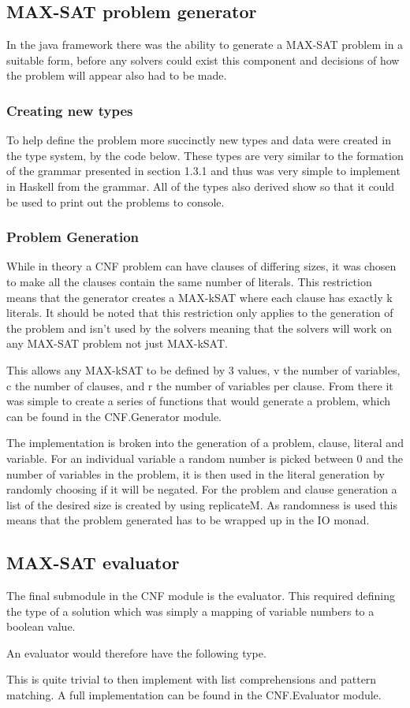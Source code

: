 \documentclass[a4paper]{article}
\begin{document}
\subsection{MAX-SAT problem generator}
In the java framework there was the ability to generate a MAX-SAT problem in a suitable form, before any solvers could exist this component and decisions of how the problem will appear also had to be made.
\subsubsection{Creating new types}
To help define the problem more succinctly new types and data were created in the type system, by the code below.
These types are very similar to the formation of the grammar presented in section 1.3.1 and thus was very simple to implement in Haskell from the grammar.
All of the types also derived show so that it could be used to print out the problems to console.

\subsubsection{Problem Generation}
While in theory a CNF problem can have clauses of differing sizes, it was chosen to make all the clauses contain the same number of literals.
This restriction means that the generator creates a MAX-kSAT where each clause has exactly k literals.
It should be noted that this restriction only applies to the generation of the problem and isn't used by the solvers meaning that the solvers will work on any MAX-SAT problem not just MAX-kSAT\@.
\par
This allows any MAX-kSAT to be defined by 3 values, v the number of variables, c the number of clauses, and r the number of variables per clause.
From there it was simple to create a series of functions that would generate a problem, which can be found in the CNF.Generator module.
\par
The implementation is broken into the generation of a problem, clause, literal and variable.
For an individual variable a random number is picked between 0 and the number of variables in the problem, it is then used in the literal generation by randomly choosing if it will be negated.
For the problem and clause generation a list of the desired size is created by using replicateM.
As randomness is used this means that the problem generated has to be wrapped up in the IO monad.

\subsection{MAX-SAT evaluator}
The final submodule in the CNF module is the evaluator.
This required defining the type of a solution which was simply a mapping of variable numbers to a boolean value.

\par
An evaluator would therefore have the following type.

This is quite trivial to then implement with list comprehensions and pattern matching.
A full implementation can be found in the CNF.Evaluator module.
\end{document}
